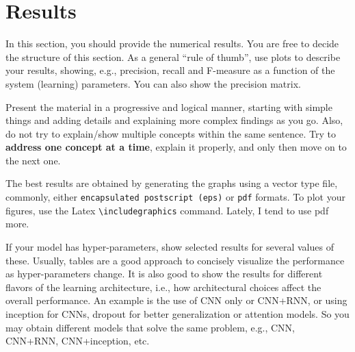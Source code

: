 
\section{Results}
\label{sec:results}

In this section, you should provide the numerical results. You are free to decide the structure of this section. As a general ``rule of thumb'', use plots to describe your results, showing, e.g., precision, recall and \mbox{F-measure} as a function of the system (learning) parameters. You can also show the precision matrix. 

\begin{remark}
Present the material in a progressive and logical manner, starting with simple things and adding details and explaining more complex findings as you go. Also, do not try to explain/show multiple concepts within the same sentence. Try to \textbf{address one concept at a time}, explain it properly, and only then move on to the next one.
\end{remark}

\begin{remark}
The best results are obtained by generating the graphs using a vector type file, commonly, either \texttt{encapsulated postscript (eps)} or \texttt{pdf} formats. To plot your figures, use the Latex \texttt{\textbackslash includegraphics} command. Lately, I tend to use pdf more.
\end{remark}

\begin{remark}
If your model has hyper-parameters, show selected results for several values of these. Usually, tables are a good approach to concisely visualize the performance as hyper-parameters change. It is also good to show the results for different flavors of the learning architecture, i.e., how architectural choices affect the overall performance. An example is the use of CNN only or CNN+RNN, or using inception for CNNs, dropout for better generalization or attention models. So you may obtain different models that solve the same problem, e.g., CNN, CNN+RNN, CNN+inception, etc.
\end{remark}

